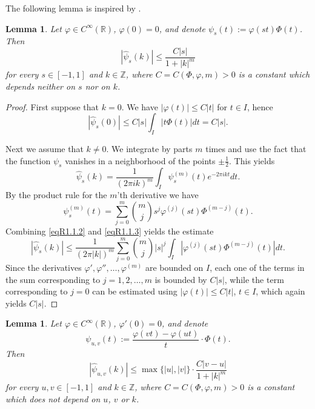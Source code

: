 \documentclass[reqno,a4paper,12pt]{amsart}
\numberwithin{equation}{section}
\numberwithin{figure}{section}
\newcommand\R{\mathbb{R}}
\newcommand\Z{\mathbb{Z}}
\newcommand\1{\mathds{1}}
\renewcommand\leq{\leqslant}
\newcommand{\ft}[1]{\widehat{#1}}
\newcommand{\half}{\tfrac{1}{2}}
\theoremstyle{plain}
\newtheorem{lem}[thm]{Lemma}
\theoremstyle{definition}
\begin{document}
The following lemma is inspired by \cite[Lemma 2.2]{KV92}.



\begin{lem}
  \label{lemR1.1}
Let $\varphi \in C^\infty(\R)$,
 $\varphi (0)=0$, and denote 
$\psi_s(t) := \varphi(st) \Phi(t)$. Then
\begin{equation}
\label{eqR1.1.6}
| \ft{\psi}_s(k) | \leq \frac{C |s|}{1+|k|^m}
\end{equation}
for every $s \in [-1,1]$ and $k \in \Z$,
where $C = C(\Phi, \varphi, m)>0$ is a constant 
 which depends neither on $s$ nor on $k$.
\end{lem}



\begin{proof}
First suppose that $k=0$.  We have
$|\varphi(t)| \leq C|t|$ for $t \in I$, hence
\begin{equation}
\label{eqR1.1.1}
|\ft{\psi}_s(0)| \leq C
|s| \int_{I} |t \Phi(t)| dt = C |s|.
\end{equation}

Next we assume that $k \neq 0$. We
integrate by parts $m$ times and use the
fact that the function $\psi_s$ vanishes in
a neighborhood of the points $\pm \half$.
This yields
\begin{equation}
\label{eqR1.1.2}
\ft{\psi}_s(k) = \frac1{(2 \pi i k)^m}
\int_{I}  \psi_s^{(m)}(t)
 e^{-2\pi i k t} dt.
\end{equation}
By the product rule for the $m$'th derivative we have
\begin{equation}
\label{eqR1.1.3}
  \psi_s^{(m)}(t)
= \sum_{j=0}^{m} \binom{m}{j}
s^j \varphi^{(j)} (st) \Phi^{(m-j)}(t).
\end{equation}
Combining \eqref{eqR1.1.2} and \eqref{eqR1.1.3} yields
the estimate
\[
| \ft{\psi}_s(k)| \leq \frac1{(2 \pi |k|)^m}
 \sum_{j=0}^{m} \binom{m}{j}
|s|^j \int_I |\varphi^{(j)} (st) \Phi^{(m-j)}(t)| dt.
\]
Since the derivatives
$\varphi', \varphi'', \dots, \varphi^{(m)}$
are bounded on $I$, each one of the terms in the sum
corresponding to $j=1,2,\dots,m$ is bounded by
$C |s|$, while the term
corresponding to $j=0$ can be estimated using
$|\varphi(t)| \leq C|t|$, $t \in I$, which again
yields $C |s|$.
\end{proof}




\begin{lem}
  \label{lemR1.5}
Let $\varphi \in C^\infty(\R)$,
 $\varphi'(0)=0$, and denote 
\begin{equation}
\psi_{u,v}(t) := \frac{\varphi(vt) - \varphi(ut)}{t} \cdot \Phi(t).
\end{equation}
 Then
\begin{equation}
\label{eqR1.5.6}
| \ft{\psi}_{u,v}(k) | \leq  \max \{|u|,|v|\} \cdot \frac{C |v-u| }{1+|k|^m}
\end{equation}
for every $u,v \in [-1,1]$ and
$k \in \Z$,
where $C = C(\Phi, \varphi, m)>0$ is a constant 
 which does not depend on $u$, $v$ or $k$.
\end{lem}
\end{document}
